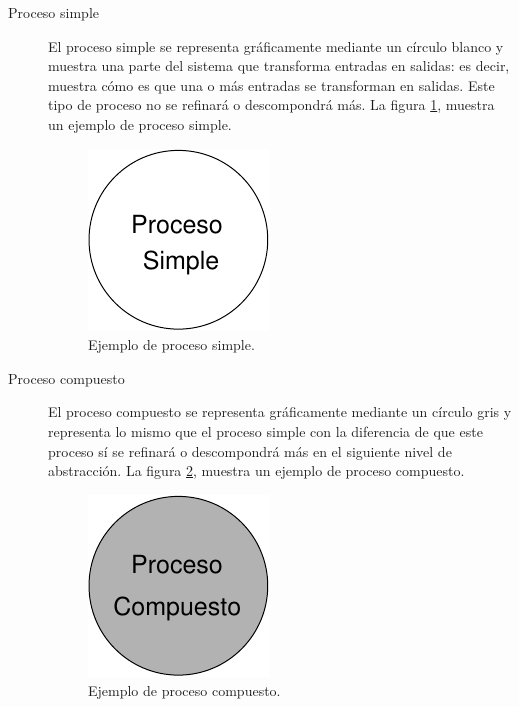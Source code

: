   \begin{description}
   \item[Proceso simple] El proceso simple se representa gráficamente mediante
        un círculo blanco y muestra una parte del sistema que transforma
        entradas en salidas: es decir, muestra cómo es que una o más entradas
        se transforman en salidas. Este tipo de proceso no se refinará o
        descompondrá más. La figura \ref{diagramaProcesoSimple}, muestra un
        ejemplo de proceso simple.

        \begin{figure}[!ht]
            \begin{center}
            \includegraphics[]{08.Analisis_Funcional/8.2.DFDs/Diagramas/proceso_simple.pdf}
            \caption{Ejemplo de proceso simple.}
            \label{diagramaProcesoSimple}
            \end{center}
         \end{figure}

   \item[Proceso compuesto] El proceso compuesto se representa gráficamente
        mediante un círculo gris y representa lo mismo que el proceso simple con
        la diferencia de que este proceso sí se refinará o descompondrá más en
        el siguiente nivel de abstracción. La figura
        \ref{diagramaProcesoCompuesto}, muestra un ejemplo de proceso compuesto.

        \begin{figure}[!ht]
            \begin{center}
            \includegraphics[]{08.Analisis_Funcional/8.2.DFDs/Diagramas/proceso_compuesto.pdf}
            \caption{Ejemplo de proceso compuesto.}
            \label{diagramaProcesoCompuesto}
            \end{center}
         \end{figure}


\end{description}
